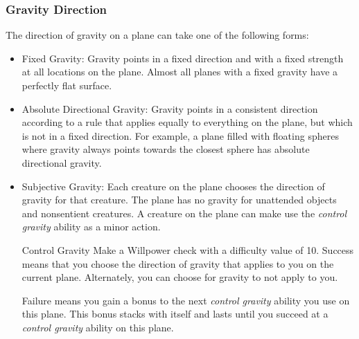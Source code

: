         \subsubsection{Gravity Direction}
            The direction of gravity on a plane can take one of the following forms:
            \begin{itemize}
                \item Fixed Gravity: Gravity points in a fixed direction and with a fixed strength at all locations on the plane.
                    Almost all planes with a fixed gravity have a perfectly flat surface.
                \item Absolute Directional Gravity: Gravity points in a consistent direction according to a rule that applies equally to everything on the plane, but which is not in a fixed direction.
                    For example, a plane filled with floating spheres where gravity always points towards the closest sphere has absolute directional gravity.
                \item Subjective Gravity: Each creature on the plane chooses the direction of gravity for that creature.
                    The plane has no gravity for unattended objects and nonsentient creatures.
                    A creature on the plane can make use the \textit{control gravity} ability as a minor action.
                    \begin{activeability}{Control Gravity}
                        \rankline
                        Make a Willpower check with a difficulty value of 10.
                        Success means that you choose the direction of gravity that applies to you on the current plane.
                        Alternately, you can choose for gravity to not apply to you.

                        Failure means you gain a  bonus to the next \textit{control gravity} ability you use on this plane.
                        This bonus stacks with itself and lasts until you succeed at a \textit{control gravity} ability on this plane.
                    \end{activeability}
            \end{itemize}

